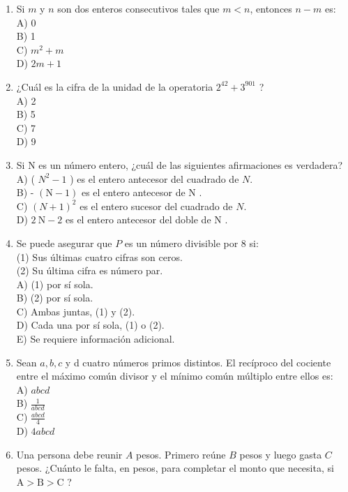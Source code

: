 \documentclass[10pt]{article}
\begin{document}
\begin{enumerate}
A) $m+1$\\
B) $m+2$\\
C) $2 m+1$\\
D) $2 m+2$
  \item Si $m$ y $n$ son dos enteros consecutivos tales que $m<n$, entonces $n-m$ es:\\
A) 0\\
B) 1\\
C) $m^{2}+m$\\
D) $2 m+1$
  \item ¿Cuál es la cifra de la unidad de la operatoria $2^{42}+3^{901}$ ?\\
A) 2\\
B) 5\\
C) 7\\
D) 9
  \item Si N es un número entero, ¿cuál de las siguientes afirmaciones es verdadera?\\
A) ( $N^{2}-1$ ) es el entero antecesor del cuadrado de $N$.\\
B) - $(\mathrm{N}-1)$ es el entero antecesor de N .\\
C) $(N+1)^{2}$ es el entero sucesor del cuadrado de $N$.\\
D) $2 \mathrm{~N}-2$ es el entero antecesor del doble de N .
  \item Se puede asegurar que $P$ es un número divisible por 8 si:\\
(1) Sus últimas cuatro cifras son ceros.\\
(2) Su última cifra es número par.\\
A) (1) por sí sola.\\
B) (2) por sí sola.\\
C) Ambas juntas, (1) y (2).\\
D) Cada una por sí sola, (1) o (2).\\
E) Se requiere información adicional.
  \item Sean $a, b, c$ y d cuatro números primos distintos. El recíproco del cociente entre el máximo común divisor y el mínimo común múltiplo entre ellos es:\\
A) $a b c d$\\
B) $\frac{1}{a b c d}$\\
C) $\frac{a b c d}{4}$\\
D) $4 a b c d$
  \item Una persona debe reunir $A$ pesos. Primero reúne $B$ pesos y luego gasta $C$ pesos. ¿Cuánto le falta, en pesos, para completar el monto que necesita, si $\mathrm{A}>\mathrm{B}>\mathrm{C}$ ?\\

\end{enumerate}
\end{document}
